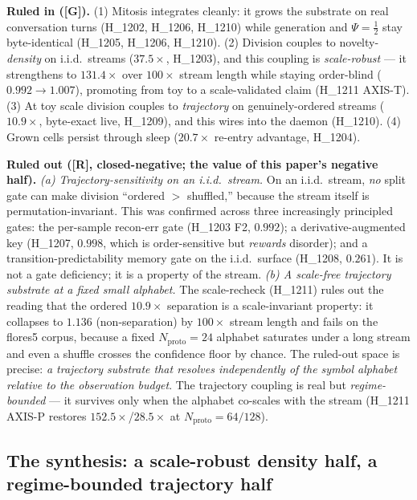 \documentclass[11pt,a4paper]{article}
\providecommand{\tierGreen}{\textbf{[G]}}
\providecommand{\tierRed}{\textbf{[R]}}
\newcommand{\Psihalf}{\Psi=\tfrac12}
\begin{document}
\textbf{Ruled in (\tierGreen).} (1) Mitosis integrates cleanly: it grows the
substrate on real conversation turns (H\_1202, H\_1206, H\_1210) while
generation and $\Psihalf$ stay byte-identical (H\_1205, H\_1206, H\_1210). (2)
Division couples to novelty-\emph{density} on i.i.d.\ streams ($37.5\times$,
H\_1203), and this coupling is \emph{scale-robust} --- it strengthens to
$131.4\times$ over $100\times$ stream length while staying order-blind
($0.992 \to 1.007$), promoting from toy to a scale-validated claim (H\_1211
AXIS-T). (3) At toy scale division couples to \emph{trajectory} on
genuinely-ordered streams ($10.9\times$, byte-exact live, H\_1209), and this
wires into the daemon (H\_1210). (4) Grown cells persist through sleep
($20.7\times$ re-entry advantage, H\_1204).

\textbf{Ruled out (\tierRed, closed-negative; the value of this paper's negative
half).} \emph{(a) Trajectory-sensitivity on an i.i.d.\ stream.} On an i.i.d.\
stream, \emph{no} split gate can make division ``ordered $>$ shuffled,'' because
the stream itself is permutation-invariant. This was confirmed across three
increasingly principled gates: the per-sample recon-err gate (H\_1203 F2,
$0.992$); a derivative-augmented key (H\_1207, $0.998$, which is order-sensitive
but \emph{rewards} disorder); and a transition-predictability memory gate on the
i.i.d.\ surface (H\_1208, $0.261$). It is not a gate deficiency; it is a property
of the stream. \emph{(b) A scale-free trajectory substrate at a fixed small
alphabet.} The scale-recheck (H\_1211) rules out the reading that the ordered
$10.9\times$ separation is a scale-invariant property: it collapses to $1.136$
(non-separation) by $100\times$ stream length and fails on the flores5 corpus,
because a fixed $N_{\text{proto}}{=}24$ alphabet saturates under a long stream and
even a shuffle crosses the confidence floor by chance. The ruled-out space is
precise: \emph{a trajectory substrate that resolves independently of the symbol
alphabet relative to the observation budget}. The trajectory coupling is real but
\emph{regime-bounded} --- it survives only when the alphabet co-scales with the
stream (H\_1211 AXIS-P restores $152.5\times$/$28.5\times$ at
$N_{\text{proto}}{=}64/128$).

\subsection{The synthesis: a scale-robust density half, a regime-bounded
trajectory half}
\label{sec:synthesis}
\end{document}
